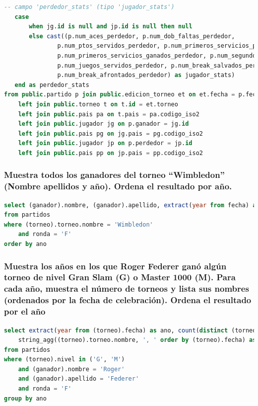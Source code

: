 \documentclass[10pt]{opticajnl}
\begin{document}
\begin{lstlisting}[language=SQL]
   -- campo 'perdedor_stats' (tipo 'jugador_stats')
   case
       when jg.id is null and jp.id is null then null
       else cast((p.num_aces_perdedor, p.num_dob_faltas_perdedor,
           	   p.num_ptos_servidos_perdedor, p.num_primeros_servicios_perdedor,
           	   p.num_primeros_servicios_ganados_perdedor, p.num_segundos_servicios_ganados_perdedor,
           	   p.num_juegos_servidos_perdedor, p.num_break_salvados_perdedor,
           	   p.num_break_afrontados_perdedor) as jugador_stats)
   end as perdedor_stats
from public.partido p join public.edicion_torneo et on et.fecha = p.fecha and et.torneo = p.torneo 
	left join public.torneo t on t.id = et.torneo
	left join public.pais pa on t.pais = pa.codigo_iso2
	left join public.jugador jg on p.ganador = jg.id
	left join public.pais pg on jg.pais = pg.codigo_iso2
	left join public.jugador jp on p.perdedor = jp.id
	left join public.pais pp on jp.pais = pp.codigo_iso2
\end{lstlisting}





\subsubsection{Muestra todos los ganadores del torneo ``Wimbledon'' (Nombre apellidos y año). Ordena el resultado por año.}

\begin{lstlisting}[language=SQL]
select (ganador).nombre, (ganador).apellido, extract(year from fecha) as ano
from partidos
where (torneo).torneo.nombre = 'Wimbledon'
	and ronda = 'F'
order by ano
\end{lstlisting}





\subsubsection{Muestra los años en los que Roger Federer ganó algún torneo de nivel Gran Slam (G) o Master 1000 (M). Para cada año, muestra el número de torneos y lista sus nombres (ordenados por la fecha de celebración). Ordena el resultado por el año}

\begin{lstlisting}[language=SQL]
select extract(year from (torneo).fecha) as ano, count(distinct (torneo).torneo.id) as numero_torneos, 
	string_agg((torneo).torneo.nombre, ', ' order by (torneo).fecha) as torneos
from partidos
where (torneo).nivel in ('G', 'M')
	and (ganador).nombre = 'Roger'
	and (ganador).apellido = 'Federer'
	and ronda = 'F'
group by ano
\end{lstlisting}
\end{document}
